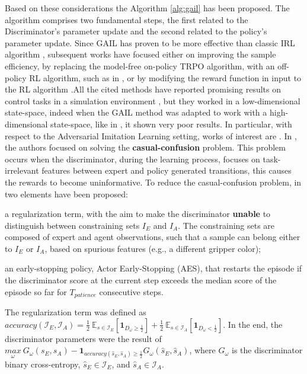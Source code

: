 Based on these considerations the Algorithm \ref{alg:gail} has been proposed. The algorithm comprises two fundamental steps, the first related to the Discriminator's parameter update and the second related to the policy's parameter update. Since GAIL has proven to be more effective than classic IRL algorithm \cite{ziebart2008maximum_entropy}, subsequent works have focused either on improving the sample efficiency, by replacing the model-free on-policy TRPO algorithm, with an off-policy RL algorithm, such as in \cite{kostrikov2018discriminator}, or by modifying the reward function in input to the RL algorithm \cite{fu2018airl,ghasemipour2020divergence_minimization_perspective}.All the cited methods have reported promising results on control tasks in a simulation environment \cite{brockman2016openai}, but they worked in a low-dimensional state-space, indeed when the GAIL method was adapted to work with a high-dimensional state-space, like in \cite{liu2018imitation_from_observation,reddy2019sqil,zolna2021task_relevant_ail,rafailov2021visual_ail}, it shown very poor results. In particular, with respect to the Adversarial Imitation Learning setting, works of interest are \cite{zolna2021task_relevant_ail,rafailov2021visual_ail}. In \cite{zolna2021task_relevant_ail}, the authors focused on solving the \textbf{casual-confusion} problem. This problem occurs when the discriminator, during the learning process, focuses on task-irrelevant features between expert and policy generated transitions, this causes the rewards to become uninformative. To reduce the casual-confusion problem, in \cite{zolna2021task_relevant_ail} two elements have been proposed: \begin{enumerate*}[label=(\textbf{\arabic*})]
    \item a regularization term, with the aim to make the discriminator \textbf{unable} to distinguish between constraining sets $I_{E}$ and $I_{A}$. The constraining sets are composed of expert and agent observations, such that a sample can belong either to $I_{E}$ or $I_{A}$, based on spurious features (e.g., a different gripper color);
    \item an early-stopping policy, Actor Early-Stopping (AES), that restarts the episode if the discriminator score at the current step exceeds the median score of the episode so far for $T_{patience}$ consecutive steps.
\end{enumerate*} The regularization term was defined as $\textit{accuracy}(\mathcal{I}_{E}, \mathcal{I}_{A}) = \frac{1}{2} \ \mathbb{E}_{s \in \mathcal{I}_{E}} \left[ \mathbf{1}_{D_{\omega} \geq  \frac{1}{2}}\right] + \frac{1}{2} \ \mathbb{E}_{s \in \mathcal{I}_{A}} \left[ \mathbf{1}_{D_{\omega} <  \frac{1}{2}}\right]$. In the end, the discriminator parameters were the result of $\underset{\omega}{max} \ G_{\omega}(s_{E},s_{A}) - \mathbf{1}_{\textit{accuracy}(\hat{s}_{E},\hat{s}_{A}) \geq \frac{1}{2}} G_{\omega}(\hat{s}_{E},\hat{s}_{A})$, where $G_{\omega}$ is the discriminator binary cross-entropy, $\hat{s}_{E} \in \mathcal{I}_{E}$, and $\hat{s}_{A} \in \mathcal{I}_{A}$. %
